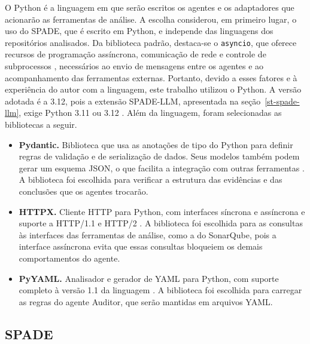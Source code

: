 O Python é a linguagem em que serão escritos os agentes e os adaptadores que acionarão as ferramentas de análise. A escolha considerou, em primeiro lugar, o uso do SPADE, que é escrito em Python, e independe das linguagens dos repositórios analisados. Da biblioteca padrão, destaca-se o \texttt{asyncio}, que oferece recursos de programação assíncrona, comunicação de rede e controle de subprocessos \cite{pythonAsyncio}, necessários ao envio de mensagens entre os agentes e ao acompanhamento das ferramentas externas. Portanto, devido a esses fatores e à experiência do autor com a linguagem, este trabalho utilizou o Python. A versão adotada é a 3.12, pois a extensão SPADE-LLM, apresentada na seção~\ref{st-spade-llm}, exige Python 3.11 ou 3.12 \cite{spadeLlmPypi}. Além da linguagem, foram selecionadas as bibliotecas a seguir.

\begin{itemize}
\item \textbf{Pydantic.} Biblioteca que usa as anotações de tipo do Python para definir regras de validação e de serialização de dados. Seus modelos também podem gerar um esquema JSON, o que facilita a integração com outras ferramentas \cite{pydanticDocs}. A biblioteca foi escolhida para verificar a estrutura das evidências e das conclusões que os agentes trocarão.
\item \textbf{HTTPX.} Cliente HTTP para Python, com interfaces síncrona e assíncrona e suporte a HTTP/1.1 e HTTP/2 \cite{httpxDocs}. A biblioteca foi escolhida para as consultas às interfaces das ferramentas de análise, como a do SonarQube, pois a interface assíncrona evita que essas consultas bloqueiem os demais comportamentos do agente.
\item \textbf{PyYAML.} Analisador e gerador de YAML para Python, com suporte completo à versão 1.1 da linguagem \cite{pyyamlDocs}. A biblioteca foi escolhida para carregar as regras do agente Auditor, que serão mantidas em arquivos YAML.
\end{itemize}

\subsection{SPADE}
\label{st-spade}

